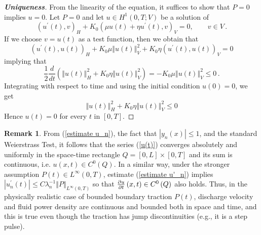 \documentclass[12pt,a4paper]{amsart}
\theoremstyle{definition}
\newtheorem{remark}{Remark}
\begin{document}
\begin{proof}
[\textbf{Uniqueness}] From the linearity of the equation, it suffices to
show that $P=0$ implies $u=0$. Let $P=0$ and let $u\in H^{1}\left(
0,T;V\right) $ be a solution of%
\begin{equation*}
\left( u^{\prime }\left( t\right) ,v\right) _{H}+K_{0}\left( \mu u\left(
t\right) +\eta u^{\prime }\left( t\right) ,v\right) _{V}=0,\qquad v\in V\,.
\end{equation*}%
If we choose $v=u\left( t\right) $ as a test function, then we obtain that
\begin{equation*}
\left( u^{\prime }\left( t\right) ,u\left( t\right) \right) _{H}+K_{0}\mu
\left\Vert u\left( t\right) \right\Vert _{V}^{2}+K_{0}\eta \left( u^{\prime
}\left( t\right) ,u\left( t\right) \right) _{V}=0
\end{equation*}%
implying that
\begin{equation*}
\frac{1}{2}\frac{d}{dt}\left( \left\Vert u\left( t\right) \right\Vert
_{H}^{2}+K_{0}\eta \left\Vert u\left( t\right) \right\Vert _{V}^{2}\right)
=-K_{0}\mu \left\Vert u\left( t\right) \right\Vert _{V}^{2}\leq 0\,.
\end{equation*}%
Integrating with respect to time and using the initial condition $u\left(
0\right) =0$, we get%
\begin{equation*}
\left\Vert u\left( t\right) \right\Vert _{H}^{2}+K_{0}\eta \left\Vert
u\left( t\right) \right\Vert _{V}^{2}\leq 0
\end{equation*}%
Hence $u\left( t\right) =0$ for every $t$ in $\left[ 0,T\right] $.
\end{proof}

\begin{remark}
From (\ref{estimate u_n}), the fact that $\left\vert y_{n}\left( x\right) \right\vert \leq 1$, and the
standard Weierstrass Test, it follows that the series (\ref{u(t)}) converges absolutely
and uniformly in the space-time rectangle $Q=\left[ 0,L\right] \times \left[ 0,T\right] $
and its sum is continuous, i.e. $u\left( x,t\right) \in C^{0}\left( Q\right)
$. In a similar way, under the stronger assumption $P\left( t\right) \in
L^{\infty }\left( 0,T\right) $, estimate (\ref{estimate u'_n}) implies $\left\vert
u_{n}^{\prime }\left( t\right) \right\vert \leq C\lambda _{n}^{-1}\left\Vert
P\right\Vert _{L^{\infty }\left( 0,T\right) }$ so that  $\frac{%
\partial u}{\partial t}\left( x,t\right) \in C^{0}\left( Q\right) $ also holds. Thus,
in the physically realistic case of bounded boundary traction $P\left(
t\right) $, discharge velocity and fluid power density are continuous and
bounded both in space and time, and this is true even though the
traction has jump discontinuities (e.g., it is a step pulse).
\end{remark}
\end{document}
